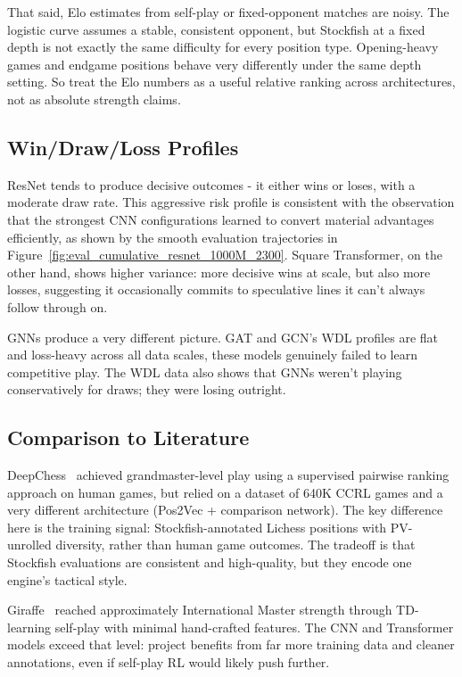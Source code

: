 That said, Elo estimates from self-play or fixed-opponent matches are noisy. The logistic curve assumes a stable, consistent opponent, but Stockfish at a fixed depth is not exactly the same difficulty for every position type. Opening-heavy games and endgame positions behave very differently under the same depth setting. So treat the Elo numbers as a useful relative ranking across architectures, not as absolute strength claims.

\subsection{Win/Draw/Loss Profiles}

ResNet tends to produce decisive outcomes - it either wins or loses, with a moderate draw rate. This aggressive risk profile is consistent with the observation that the strongest CNN configurations learned to convert material advantages efficiently, as shown by the smooth evaluation trajectories in Figure~\ref{fig:eval_cumulative_resnet_1000M_2300}. Square Transformer, on the other hand, shows higher variance: more decisive wins at scale, but also more losses, suggesting it occasionally commits to speculative lines it can't always follow through on.

GNNs produce a very different picture. GAT and GCN's WDL profiles are flat and loss-heavy across all data scales, these models genuinely failed to learn competitive play. The WDL data also shows that GNNs weren't playing conservatively for draws; they were losing outright.

\subsection{Comparison to Literature}

DeepChess~\cite{deep_chess_paper} achieved grandmaster-level play using a supervised pairwise ranking approach on human games, but relied on a dataset of 640K CCRL games and a very different architecture (Pos2Vec + comparison network). The key difference here is the training signal: Stockfish-annotated Lichess positions with PV-unrolled diversity, rather than human game outcomes. The tradeoff is that Stockfish evaluations are consistent and high-quality, but they encode one engine's tactical style.

Giraffe~\cite{deep_learning_game_ai} reached approximately International Master strength through TD-learning self-play with minimal hand-crafted features. The CNN and Transformer models exceed that level: project benefits from far more training data and cleaner annotations, even if self-play RL would likely push further.

